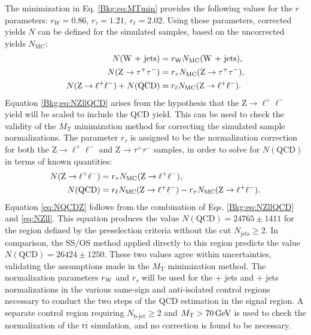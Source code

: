 \documentclass[12pt]{thesis}  %
\renewcommand{\ttbar}{\ensuremath{\mathrm{t}\overline{\mathrm{t}}}\xspace}
\newcommand{\PZ}{\ensuremath{{\mathrm{Z}}}\xspace}%
\newcommand{\ra}{\ensuremath{\rightarrow}}%
\newcommand{\TpTm}{\ensuremath{\tau^+\tau^-}}%
\newcommand{\LpLm}{\ensuremath{\ell^+\ell^-}}%
\newcommand{\MT}{\ensuremath{{M}_{\text{T}}}\xspace}%
\newcommand{\Ztt}{\ensuremath{\PZ \ra \TpTm}\xspace}%
\newcommand{\Zll}{\ensuremath{\PZ \ra \LpLm}\xspace}%
\begin{document}
The minimization in Eq. \eqref{Bkg:eq:MTmin} provides the following values for the $r$ parameters: $r_{W} = 0.86$, $r_{\tau} = 1.21$, $r_{\ell} = 2.02$. Using these parameters, corrected yields $N$ can be defined for the simulated samples, based on the uncorrected yields $N_{\text{MC}}$:
\begin{align}
N(\text{\W + jets}) &= r_{\W}N_{\text{MC}}(\text{\W + jets}), \\
N(\Ztt) &= r_{\tau}N_{\text{MC}}(\text{\Ztt}), \\
N(\Zll) + N(\text{QCD}) &= r_{\ell}N_{\text{MC}}(\text{\Zll}). \label{Bkg:eq:NZllQCD}
\end{align}
Equation \eqref{Bkg:eq:NZllQCD} arises from the hypothesis that the \Zll yield will be scaled to include the QCD yield. This can be used to check the validity of the \MT minimization method for correcting the simulated sample normalizations. The parameter $r_{\tau}$ is assigned to be the normalization correction for both the \Zll and \Ztt samples, in order to solve for $N(\text{QCD})$ in terms of known quantities:
\begin{align}
N(\Zll) &= r_{\tau}N_{\text{MC}}(\text{\Zll}), \label{eq:NZll} \\
N(\text{QCD}) &= r_{\ell}N_{\text{MC}}(\text{\Zll}) - r_{\tau}N_{\text{MC}}(\text{\Zll}). \label{eq:NQCDZ}
\end{align}
Equation \eqref{eq:NQCDZ} follows from the combination of Eqs. \eqref{Bkg:eq:NZllQCD} and \eqref{eq:NZll}. This equation produces the value $N(\text{QCD}) = 24765 \pm 1411$ for the region defined by the preselection criteria without the cut $N_{\text{jets}}\geq2$. In comparison, the SS/OS method applied directly to this region predicts the value $N(\text{QCD}) = 26424 \pm 1250$. These two values agree within uncertainties, validating the assumptions made in the \MT minimization method. The normalization parameters $r_{\mathrm{W}}$ and $r_{\tau}$ will be used for the \W + jets and \Z + jets normalizations in the various same-sign and anti-isolated control regions necessary to conduct the two steps of the QCD estimation in the signal region. A separate control region requiring $N_{\text{b-jet}}\geq2$ and $\MT>70\GeV$ is used to check the normalization of the \ttbar simulation, and no correction is found to be necessary.
\end{document}
